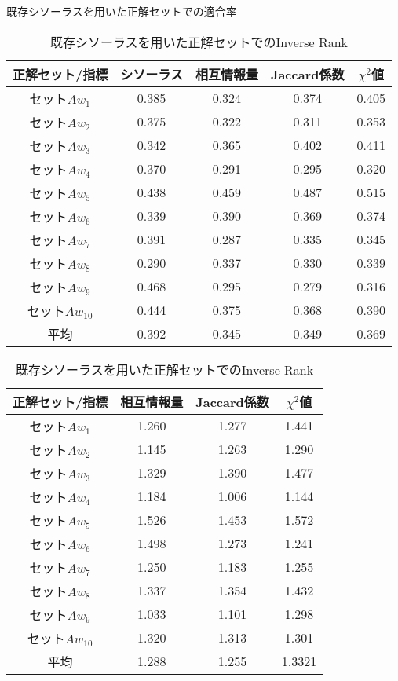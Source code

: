 \documentclass[japanese]{jnlp_1.3a}
\begin{document}
\begin{table}[b]
	\begin{center}
	 \caption{既存シソーラスを用いた正解セットでの適合率}
	 \label{result-wordnet}
	 \begin{tabular}{c|c|c|c|c}
	  正解セット/指標 & シソーラス & 相互情報量 & Jaccard係数 & $\chi^2$値 \\ \hline
	  セット$Aw_1$ & 0.385 & 0.324 & 0.374 & 0.405 \\
	  セット$Aw_2$ & 0.375 & 0.322 & 0.311 & 0.353 \\
	  セット$Aw_3$ & 0.342 & 0.365 & 0.402 & 0.411 \\
	  セット$Aw_4$ & 0.370 & 0.291 & 0.295 & 0.320 \\
	  セット$Aw_5$ & 0.438 & 0.459 & 0.487 & 0.515 \\
	  セット$Aw_6$ & 0.339 & 0.390 & 0.369 & 0.374 \\
	  セット$Aw_7$ & 0.391 & 0.287 & 0.335 & 0.345 \\
	  セット$Aw_8$ & 0.290 & 0.337 & 0.330 & 0.339 \\
	  セット$Aw_9$ & 0.468 & 0.295 & 0.279 & 0.316 \\
	  セット$Aw_{10}$ & 0.444 & 0.375 & 0.368 & 0.390 \\ \hline
	  平均  & 0.392 & 0.345 & 0.349 & 0.369 \\
	 \end{tabular}
    \vspace{\baselineskip}

	 \caption{既存シソーラスを用いた正解セットでのInverse Rank}
	 \label{result-wordnet-inv}
	 \begin{tabular}{c|c|c|c}
	  正解セット/指標 & 相互情報量 & Jaccard係数 & $\chi^2$値 \\
	  \hline
	  セット$Aw_1$ & 1.260 & 1.277 & 1.441 \\
	  セット$Aw_2$ & 1.145 & 1.263 & 1.290 \\
	  セット$Aw_3$ & 1.329 & 1.390 & 1.477 \\
	  セット$Aw_4$ & 1.184 & 1.006 & 1.144 \\
	  セット$Aw_5$ & 1.526 & 1.453 & 1.572 \\
	  セット$Aw_6$ & 1.498 & 1.273 & 1.241 \\
	  セット$Aw_7$ & 1.250 & 1.183 & 1.255 \\
	  セット$Aw_8$ & 1.337 & 1.354 & 1.432 \\
	  セット$Aw_9$ & 1.033 & 1.101 & 1.298 \\
	  セット$Aw_{10}$ & 1.320 & 1.313 & 1.301 \\ \hline
	  平均  & 1.288 & 1.255 & 1.3321 \\ 
	 \end{tabular}
	\end{center}
\end{table}
\end{document}

